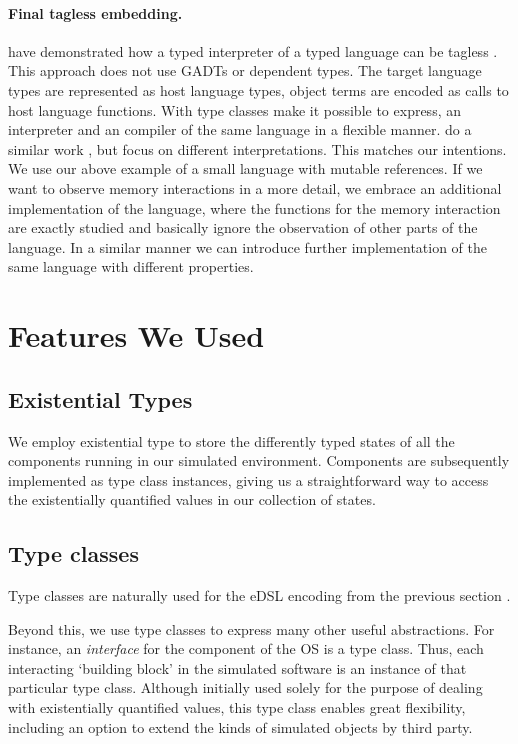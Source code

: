 \paragraph{Final tagless embedding.}
\citeauthor{final_tagless_embedding} have demonstrated how a typed interpreter of a typed language can be tagless \cite{final_tagless_embedding}.
This approach does not use GADTs or dependent types.
The target language types are represented as host language types, object terms are encoded as calls to host language functions. With type classes \citeauthor{final_tagless_embedding} make it possible to express, \eg an interpreter and an compiler of the same language in a flexible manner.
\citeauthor{Hofer:2008:PED:1449913.1449935} do a similar work \cite{Hofer:2008:PED:1449913.1449935}, but focus on different interpretations.
This matches our intentions.
We use our above example of a small language with mutable references.
If we want to observe memory interactions in a more detail, we embrace an additional implementation of the language, where the functions for the memory interaction are exactly studied and basically ignore the observation of other parts of the language.
In a similar manner we can introduce further implementation of the same language with different properties.

\section{Features We Used}
\label{sec:impl-detail}

\subsection{Existential Types}
We employ existential type to store the differently typed states of all the components running in our simulated environment.
Components are subsequently implemented as type class instances, giving us a straightforward way to access the existentially quantified values in our collection of states.

\subsection{Type classes}
Type classes are naturally used for the eDSL encoding from the previous section \cite{Hall:1996:TCH:227699.227700,final_tagless_embedding}.

Beyond this, we use type classes to express many other useful abstractions.
For instance, an \emph{interface} for the component of the OS is a type class.
Thus, each interacting `building block' in the simulated software is an instance of that particular type class.
Although initially used solely for the purpose of dealing with existentially quantified values, this  type class enables great flexibility, including an option to extend the kinds of simulated objects by third party.

